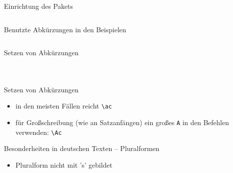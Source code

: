 \documentclass[presentation,aspectratio=169]{beamer}
\begin{document}
\begin{frame}[fragile]{Einrichtung des Pakets}
  \inputminted{latex}{codebeispiele/acro-setup.tex}
\end{frame}

\begin{frame}[fragile]{Benutzte Abkürzungen in den Beispielen}
  \inputminted{latex}{codebeispiele/acro-used-acronyms.tex}
\end{frame}

\begin{frame}[fragile]{Setzen von Abkürzungen}
  \begin{columns}
    \begin{column}{.49\textwidth}
      
    \end{column}
    \begin{column}{.5\textwidth}
      \inputminted{latex}{codebeispiele/acro-usage.tex}
    \end{column}
  \end{columns}
\end{frame}

\begin{frame}[fragile]{Setzen von Abkürzungen}
  \begin{itemize}
    \item in den meisten Fällen reicht \verb|\ac|
    \item für Großschreibung (wie an Satzanfängen) ein großes \verb|A| in den Befehlen verwenden: \verb|\Ac|
  \end{itemize}
\end{frame}

\begin{frame}[fragile]{Besonderheiten in deutschen Texten -- Pluralformen}
  \begin{itemize}
    \item Pluralform nicht mit 's' gebildet
  \end{itemize}
  \inputminted[firstline=8,lastline=8]{latex}{codebeispiele/acro-used-acronyms.tex}
  \vspace{2em}
  \begin{columns}
    \begin{column}{.49\textwidth}
      
    \end{column}
    \begin{column}{.5\textwidth}
      \inputminted{latex}{codebeispiele/acro-german-plurals.tex}
    \end{column}
  \end{columns}
\end{frame}
\end{document}
